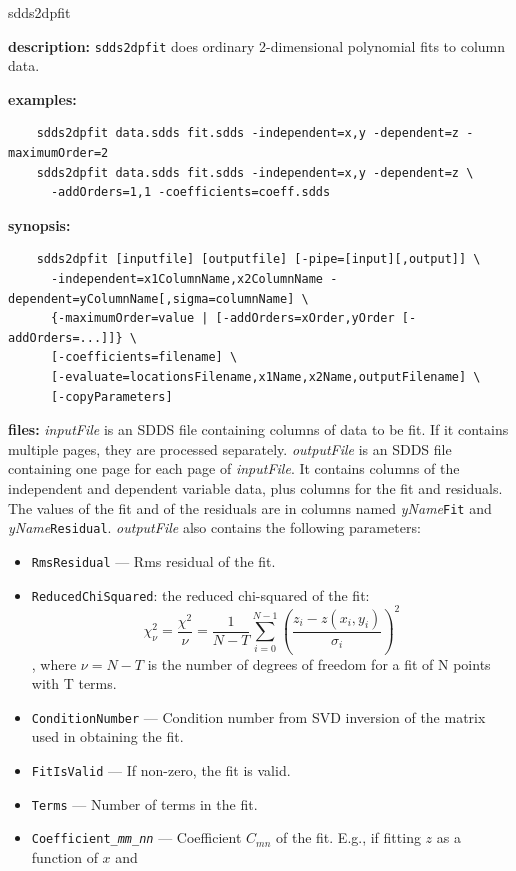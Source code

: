 \begin{sddsprog}{sdds2dpfit}
  \item \textbf{description:} \verb|sdds2dpfit| does ordinary 2-dimensional polynomial fits to column data.
  \item \textbf{examples:}
    \begin{verbatim}
    sdds2dpfit data.sdds fit.sdds -independent=x,y -dependent=z -maximumOrder=2
    sdds2dpfit data.sdds fit.sdds -independent=x,y -dependent=z \
      -addOrders=1,1 -coefficients=coeff.sdds
    \end{verbatim}
  \item \textbf{synopsis:}
    \begin{verbatim}
    sdds2dpfit [inputfile] [outputfile] [-pipe=[input][,output]] \
      -independent=x1ColumnName,x2ColumnName -dependent=yColumnName[,sigma=columnName] \
      {-maximumOrder=value | [-addOrders=xOrder,yOrder [-addOrders=...]]} \
      [-coefficients=filename] \
      [-evaluate=locationsFilename,x1Name,x2Name,outputFilename] \
      [-copyParameters]
    \end{verbatim}
  \item \textbf{files:}
    \emph{inputFile} is an SDDS file containing columns of data to be fit. If it contains multiple pages, they are processed
    separately. \emph{outputFile} is an SDDS file containing one page for each page of \emph{inputFile}. It contains columns of
    the independent and dependent variable data, plus columns for the fit and residuals. The values of the fit
    and of the residuals are in columns named \emph{yName}{\tt Fit} and \emph{yName}{\tt Residual}. \emph{outputFile} also contains
    the following parameters:
    \begin{itemize}
      \item {\tt RmsResidual} --- Rms residual of the fit.
      \item {\tt ReducedChiSquared}: the reduced chi-squared of the fit:
        $$ \chi^2_\nu = \frac{\chi^2}{\nu} = \frac{1}{N-T}\sum_{i=0}^{N-1} \left(\frac{z_i - z(x_i, y_i)}{\sigma_i}\right)^2 $$,
        where $\nu = N-T$ is the number of degrees of freedom for a fit of N points with T terms.
      \item {\tt ConditionNumber} --- Condition number from SVD inversion of the matrix used in obtaining the fit.
      \item {\tt FitIsValid} --- If non-zero, the fit is valid.
      \item {\tt Terms} --- Number of terms in the fit.
      \item {\tt Coefficient\_{\em mm}\_{\em nn}} --- Coefficient $C_{mn}$ of the fit. E.g., if fitting $z$ as a function of $x$ and

\end{itemize}
\end{sddsprog}
